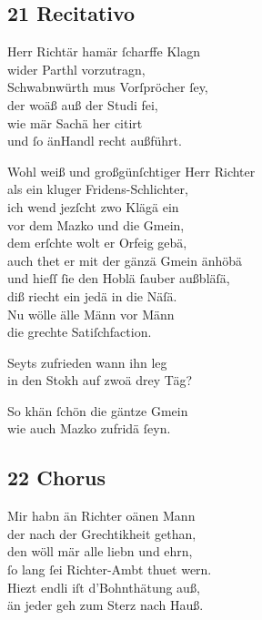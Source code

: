 \documentclass{ees}
\newenvironment{lyrics}[1]{%
  \subsection{#1}\nopagebreak%
  \begin{lyricslist}%
  \let\voice\item%
}{%
  \end{lyricslist}%
}
\begin{document}
\clearpage
\begin{lyrics}{21 Recitativo}
  \voice[Mazko]
  Herr Richtär hamär ſcharffe Klagn\\
  wider Parthl vorzutragn,\\
  Schwabnwürth mus Vorſpröcher ſey,\\
  der woäß auß der Studi fei,\\
  wie mär Sachä her citirt\\
  und ſo änHandl recht außführt.

  \voice[Schwabnwürth]
  Wohl weiß und großgünſchtiger Herr Richter\\
  als ein kluger Fridens-Schlichter,\\
  ich wend jezſcht zwo Klägä ein\\
  vor dem Mazko und die Gmein,\\
  dem erſchte wolt er Orfeig gebä,\\
  auch thet er mit der gänzä Gmein änhöbä\\
  und hieſſ ſie den Hoblä ſauber außbläſä,\\
  diß riecht ein jedä in die Näſä.\\
  Nu wölle älle Männ vor Männ\\
  die grechte Satiſchfaction.

  \voice[Richter]
  Seyts zufrieden wann ihn leg\\
  in den Stokh auf zwoä drey Täg?

  \voice[Schwabnwürth]
  So khän ſchön die gäntze Gmein\\
  wie auch Mazko zufridä ſeyn.
\end{lyrics}

\begin{lyrics}{22 Chorus}
  \voice[alle]
  Mir habn än Richter oänen Mann\\
  der nach der Grechtikheit gethan,\\
  den wöll mär alle liebn und ehrn,\\
  ſo lang ſei Richter-Ambt thuet wern.\\
  Hiezt endli iſt d’Bohnthätung auß,\\
  än jeder geh zum Sterz nach Hauß.
\end{lyrics}
\end{document}
